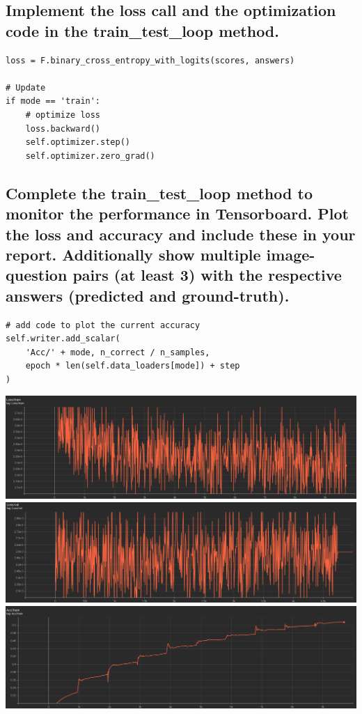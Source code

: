 \documentclass{article}
\begin{document}
\subsection{Implement the loss call and the optimization code in the train\_test\_loop method.}
\begin{lstlisting}
loss = F.binary_cross_entropy_with_logits(scores, answers)

# Update
if mode == 'train':
    # optimize loss
    loss.backward()
    self.optimizer.step()
    self.optimizer.zero_grad()
\end{lstlisting}

\subsection{Complete the train\_test\_loop method to monitor the performance in Tensorboard. Plot the loss and accuracy and include these in your report. Additionally show multiple image-question pairs (at least 3) with the respective answers (predicted and ground-truth).}
\begin{lstlisting}
# add code to plot the current accuracy
self.writer.add_scalar(
    'Acc/' + mode, n_correct / n_samples,
    epoch * len(self.data_loaders[mode]) + step
)
\end{lstlisting}
\includegraphics[width=\textwidth]{q2.6_1.png}
\includegraphics[width=\textwidth]{q2.6_2.png}
\includegraphics[width=\textwidth]{q2.6_3.png}
\end{document}
